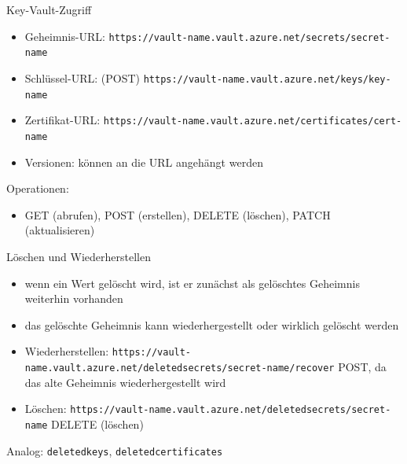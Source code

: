 \begin{flashcard}[Definition]{Key-Vault-Zugriff}
    \begin{itemize}
        \item Geheimnis-URL:\newline
            \texttt{https://vault-name.vault.azure.net/secrets/secret-name}\newline
        \item Schlüssel-URL: (POST)\newline
            \texttt{https://vault-name.vault.azure.net/keys/key-name}\newline
        \item Zertifikat-URL:\newline
            \texttt{https://vault-name.vault.azure.net/certificates/cert-name}\newline
        \item Versionen: können an die URL angehängt werden
    \end{itemize}
    Operationen:
    \begin{itemize}
        \item GET (abrufen), POST (erstellen), DELETE (löschen), PATCH (aktualisieren)
    \end{itemize}
\end{flashcard}


\begin{flashcard}[Definition]{Löschen und Wiederherstellen}
    \begin{itemize}
        \item wenn ein Wert gelöscht wird, ist er zunächst als gelöschtes Geheimnis weiterhin vorhanden
        \item das gelöschte Geheimnis kann wiederhergestellt oder wirklich gelöscht werden
        \item Wiederherstellen:\newline
            \texttt{https://vault-name.vault.azure.net/deletedsecrets/secret-name/recover}\newline
            POST, da das alte Geheimnis wiederhergestellt wird
        \item Löschen:\newline
            \texttt{https://vault-name.vault.azure.net/deletedsecrets/secret-name}\newline
            DELETE (löschen)
    \end{itemize}
    Analog: \texttt{deletedkeys}, \texttt{deletedcertificates}
\end{flashcard}
